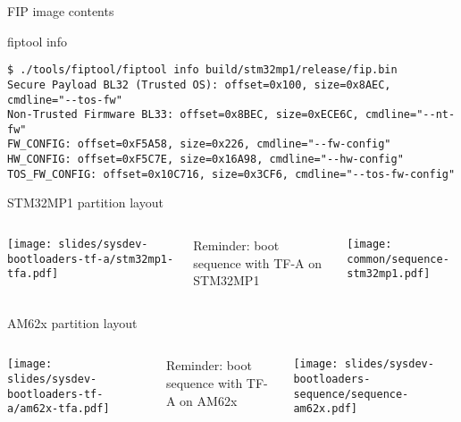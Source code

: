 \begin{frame}[fragile]{FIP image contents}
  \begin{block}{fiptool info}
    {\footnotesize
\begin{verbatim}
$ ./tools/fiptool/fiptool info build/stm32mp1/release/fip.bin
Secure Payload BL32 (Trusted OS): offset=0x100, size=0x8AEC, cmdline="--tos-fw"
Non-Trusted Firmware BL33: offset=0x8BEC, size=0xECE6C, cmdline="--nt-fw"
FW_CONFIG: offset=0xF5A58, size=0x226, cmdline="--fw-config"
HW_CONFIG: offset=0xF5C7E, size=0x16A98, cmdline="--hw-config"
TOS_FW_CONFIG: offset=0x10C716, size=0x3CF6, cmdline="--tos-fw-config"
\end{verbatim}
    }
  \end{block}
\end{frame}

\begin{frame}{STM32MP1 partition layout}
  \begin{columns}
  \begin{center}
    \texttt{[image: slides/sysdev-bootloaders-tf-a/stm32mp1-tfa.pdf]}
  \end{center}
  \small Reminder: boot sequence with TF-A on STM32MP1
  \begin{center}
    \texttt{[image: common/sequence-stm32mp1.pdf]}
  \end{center}
  \end{columns}
\end{frame}

\begin{frame}{AM62x partition layout}
  \begin{columns}
  \begin{center}
    \texttt{[image: slides/sysdev-bootloaders-tf-a/am62x-tfa.pdf]}
  \end{center}
  \small Reminder: boot sequence with TF-A on AM62x
  \begin{center}
    \texttt{[image: slides/sysdev-bootloaders-sequence/sequence-am62x.pdf]}
  \end{center}
  \end{columns}
\end{frame}
